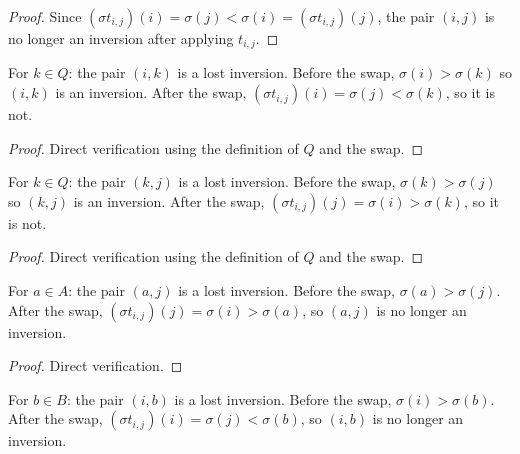\begin{proof}
\leanok
Since $(\sigma t_{i,j})(i) = \sigma(j) < \sigma(i) = (\sigma t_{i,j})(j)$,
the pair $(i,j)$ is no longer an inversion after applying $t_{i,j}$.
\end{proof}

\begin{lemma}
\label{lem.perm.ik_lost_for_k_in_Q}
\leanhelper
\leanok
For $k \in Q$: the pair $(i, k)$ is a lost inversion.
Before the swap, $\sigma(i) > \sigma(k)$ so $(i,k)$ is an inversion.
After the swap, $(\sigma t_{i,j})(i) = \sigma(j) < \sigma(k)$, so it is not.
\end{lemma}

\begin{proof}
\leanok
Direct verification using the definition of $Q$ and the swap.
\end{proof}

\begin{lemma}
\label{lem.perm.kj_lost_for_k_in_Q}
\leanhelper
\leanok
For $k \in Q$: the pair $(k, j)$ is a lost inversion.
Before the swap, $\sigma(k) > \sigma(j)$ so $(k,j)$ is an inversion.
After the swap, $(\sigma t_{i,j})(j) = \sigma(i) > \sigma(k)$, so it is not.
\end{lemma}

\begin{proof}
\leanok
Direct verification using the definition of $Q$ and the swap.
\end{proof}

\begin{lemma}
\label{lem.perm.aj_lost_for_a_in_A}
\leanhelper
\leanok
For $a \in A$: the pair $(a, j)$ is a lost inversion.
Before the swap, $\sigma(a) > \sigma(j)$. After the swap,
$(\sigma t_{i,j})(j) = \sigma(i) > \sigma(a)$, so $(a,j)$ is no longer an inversion.
\end{lemma}

\begin{proof}
\leanok
Direct verification.
\end{proof}

\begin{lemma}
\label{lem.perm.ib_lost_for_b_in_B}
\leanhelper
\leanok
For $b \in B$: the pair $(i, b)$ is a lost inversion.
Before the swap, $\sigma(i) > \sigma(b)$. After the swap,
$(\sigma t_{i,j})(i) = \sigma(j) < \sigma(b)$, so $(i,b)$ is no longer an inversion.
\end{lemma}


